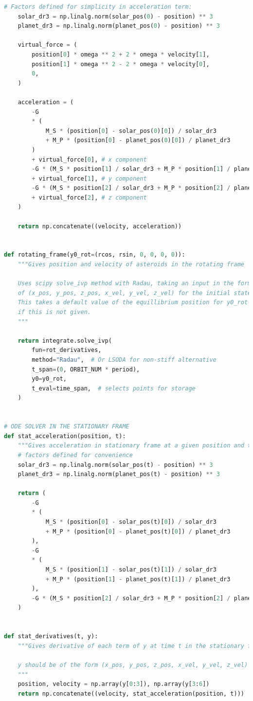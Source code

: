 \documentclass[11pt, a4paper,twocolumn]{article} %
\begin{document}
\begin{appendices}
\begin{lstlisting}[language=Python]
	# Factors defined for simplicity in acceleration term:
	solar_dr3 = np.linalg.norm(solar_pos(0) - position) ** 3
	planet_dr3 = np.linalg.norm(planet_pos(0) - position) ** 3
	
	virtual_force = (
		position[0] * omega ** 2 + 2 * omega * velocity[1],
		position[1] * omega ** 2 - 2 * omega * velocity[0],
		0,
	)
	
	acceleration = (
		-G
		* (
			M_S * (position[0] - solar_pos(0)[0]) / solar_dr3
			+ M_P * (position[0] - planet_pos(0)[0]) / planet_dr3
		)
		+ virtual_force[0], # x component 
		-G * (M_S * position[1] / solar_dr3 + M_P * position[1] / planet_dr3)
		+ virtual_force[1], # y component 
		-G * (M_S * position[2] / solar_dr3 + M_P * position[2] / planet_dr3)
		+ virtual_force[2], # z component 
	)
	
	return np.concatenate((velocity, acceleration))


def rotating_frame(y0_rot=(rcos, rsin, 0, 0, 0, 0)):
	"""Gives position and velocity of asteroids in the rotating frame
	
	Uses scipy solve_ivp method with Radau, taking an input in the form
	of (x_pos, y_pos, z_pos, x_vel, y_vel, z_vel) for the initial state.
	This takes a default value of the equillibrium position for y0_rot 
	if this is not given.
	"""
	
	return integrate.solve_ivp(
		fun=rot_derivatives,
		method="Radau",  # Or LSODA for non-stiff alternative
		t_span=(0, ORBIT_NUM * period),
		y0=y0_rot,
		t_eval=time_span,  # selects points for storage
	)


# ODE SOLVER IN THE STATIONARY FRAME
def stat_acceleration(position, t):
	"""Gives acceleration in stationary frame at a given position and time"""
	# factors defined for convenience
	solar_dr3 = np.linalg.norm(solar_pos(t) - position) ** 3
	planet_dr3 = np.linalg.norm(planet_pos(t) - position) ** 3
	
	return (
		-G
		* (
			M_S * (position[0] - solar_pos(t)[0]) / solar_dr3
			+ M_P * (position[0] - planet_pos(t)[0]) / planet_dr3
		),
		-G
		* (
			M_S * (position[1] - solar_pos(t)[1]) / solar_dr3
			+ M_P * (position[1] - planet_pos(t)[1]) / planet_dr3
		),
		-G * (M_S * position[2] / solar_dr3 + M_P * position[2] / planet_dr3),
	)


def stat_derivatives(t, y):
	"""Gives derivative of each term of y at time t in the stationary frame
	
	y should be of the form (x_pos, y_pos, z_pos, x_vel, y_vel, z_vel)
	"""
	position, velocity = np.array(y[0:3]), np.array(y[3:6])
	return np.concatenate((velocity, stat_acceleration(position, t)))



\end{lstlisting}
\end{appendices}
\end{document}
